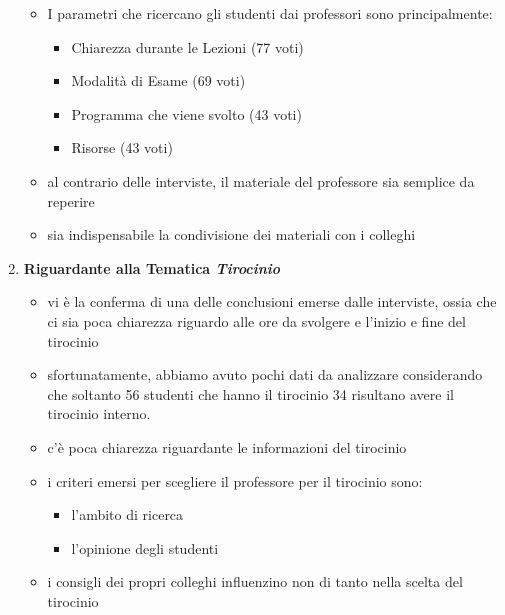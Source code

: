 \begin{enumerate}
    \begin{itemize}
        \item I parametri che ricercano gli studenti dai professori sono principalmente:
        \begin{itemize}
            \item Chiarezza durante le Lezioni (77 voti)
            \item Modalità di Esame (69 voti)
            \item Programma che viene svolto (43 voti)
            \item Risorse (43 voti)
        \end{itemize}
        \item al contrario delle interviste, il materiale del professore sia semplice da reperire
        \item sia indispensabile la condivisione dei materiali con i colleghi
    \end{itemize}
    
    \item \textbf{Riguardante alla Tematica \textit{Tirocinio}}
    \begin{itemize}
        \item vi è la conferma di una delle conclusioni emerse dalle interviste, ossia che ci sia poca chiarezza riguardo alle ore da svolgere e l'inizio e fine del tirocinio
        \item sfortunatamente, abbiamo avuto pochi dati da analizzare considerando che soltanto 56 studenti che hanno il tirocinio 34 risultano avere il tirocinio interno.
        \item c'è poca chiarezza riguardante le informazioni del tirocinio
        \item i criteri emersi per scegliere il professore per il tirocinio sono:
        \begin{itemize}
            \item l'ambito di ricerca
            \item l'opinione degli studenti
        \end{itemize}
        \item i consigli dei propri colleghi influenzino non di tanto nella scelta del tirocinio
    \end{itemize}
    
\end{enumerate}

